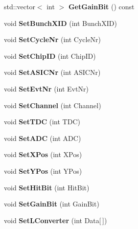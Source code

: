 \begin{DoxyCompactItemize}
\item 
std::vector$<$ int $>$ {\bfseries GetGainBit} () const \label{classLConverter_a5e61fac60253d34fa40a9c5442a13196}

\item 
void {\bfseries SetBunchXID} (int BunchXID)\label{classLConverter_a05a8cef4b9c87f720261fc52cce1e193}

\item 
void {\bfseries SetCycleNr} (int CycleNr)\label{classLConverter_a7efeeb526c6db39ff43a017bb74b29e0}

\item 
void {\bfseries SetChipID} (int ChipID)\label{classLConverter_a37f140c2b9055799ee6a82cc4d73c44e}

\item 
void {\bfseries SetASICNr} (int ASICNr)\label{classLConverter_acfc4cc61fc627016acaf883f4d0046d4}

\item 
void {\bfseries SetEvtNr} (int EvtNr)\label{classLConverter_ac5115b177d290824b2a787b9e068fc19}

\item 
void {\bfseries SetChannel} (int Channel)\label{classLConverter_a340a2d351e2fdadccaf9dd197f50237c}

\item 
void {\bfseries SetTDC} (int TDC)\label{classLConverter_a08fa1525b279272c5c5e54b63d1cb201}

\item 
void {\bfseries SetADC} (int ADC)\label{classLConverter_ac5bd4c6306a2cee6a935e973058a905a}

\item 
void {\bfseries SetXPos} (int XPos)\label{classLConverter_a6971660f486140f26227ceaf7a8ce09a}

\item 
void {\bfseries SetYPos} (int YPos)\label{classLConverter_adc5fee91ab6526179b186ad11ab25c7e}

\item 
void {\bfseries SetHitBit} (int HitBit)\label{classLConverter_aaa94bc9bb1609136b6fd81523649c53c}

\item 
void {\bfseries SetGainBit} (int GainBit)\label{classLConverter_a8c8d34fb8da1b09a171ca7ab345aaaaf}

\item 
void {\bfseries SetLConverter} (int Data[$\,$])\label{classLConverter_a180d5e6b80a72eeab6ab0cb090d0c740}


\end{DoxyCompactItemize}
